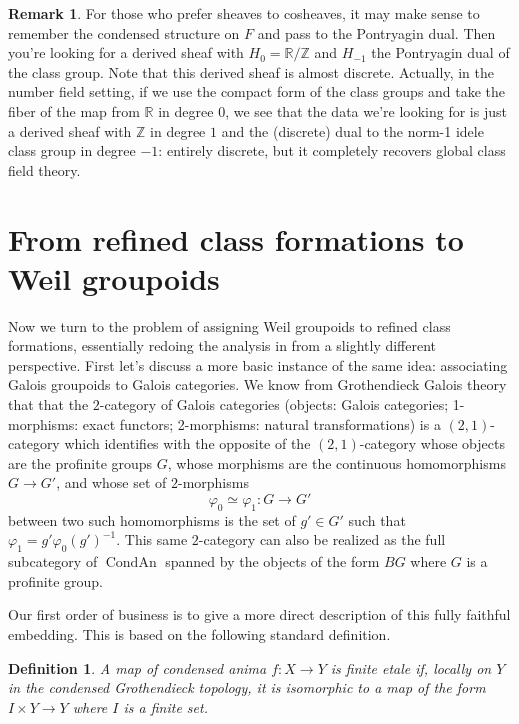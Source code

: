 \documentclass[12pt]{article}
\newtheorem{definition}[theorem]{Definition}
\theoremstyle{definition}
\newtheorem{remark}[theorem]{Remark}
\newcommand{\on}{\operatorname}
\newcommand{\mbb}{\mathbb}
\begin{document}
\begin{remark}
For those who prefer sheaves to cosheaves, it may make sense to remember the condensed structure on $F$ and pass to the Pontryagin dual.  Then you're looking for a derived sheaf with $H_0=\mbb{R}/\mbb{Z}$ and $H_{-1}$ the Pontryagin dual of the class group.  Note that this derived sheaf is almost discrete.  Actually, in the number field setting, if we use the compact form of the class groups and take the fiber of the map from $\mbb{R}$ in degree $0$, we see that the data we're looking for is just a derived sheaf with $\mbb{Z}$ in degree $1$ and the (discrete) dual to the norm-1 idele class group in degree $-1$: entirely discrete, but it completely recovers global class field theory.
\end{remark}


\section{From refined class formations to Weil groupoids}

Now we turn to the problem of assigning Weil groupoids to refined class formations, essentially redoing the analysis in \cite{artintate} from a slightly different perspective.  First let's discuss a more basic instance of the same idea: associating Galois groupoids to Galois categories.  We know from Grothendieck Galois theory that that the $2$-category of Galois categories (objects: Galois categories; 1-morphisms: exact functors; 2-morphisms: natural transformations) is a $(2,1)$-category which identifies with the opposite of the $(2,1)$-category whose objects are the profinite groups $G$, whose morphisms are the continuous homomorphisms $G\to G'$, and whose set of $2$-morphisms
$$\varphi_0\simeq \varphi_1: G\to G'$$
between two such homomorphisms is the set of $g'\in G'$ such that $\varphi_1 = g'\varphi_0 (g')^{-1}$.  This same $2$-category can also be realized as the full subcategory of $\on{CondAn}$ spanned by the objects of the form $BG$ where $G$ is a profinite group.

Our first order of business is to give a more direct description of this fully faithful embedding.  This is based on the following standard definition.

\begin{definition}
A map of condensed anima $f:X \to Y$ is \emph{finite etale} if, locally on $Y$ in the condensed Grothendieck topology, it is isomorphic to a map of the form $I\times Y \to Y$ where $I$ is a finite set.
\end{definition}
\end{document}
